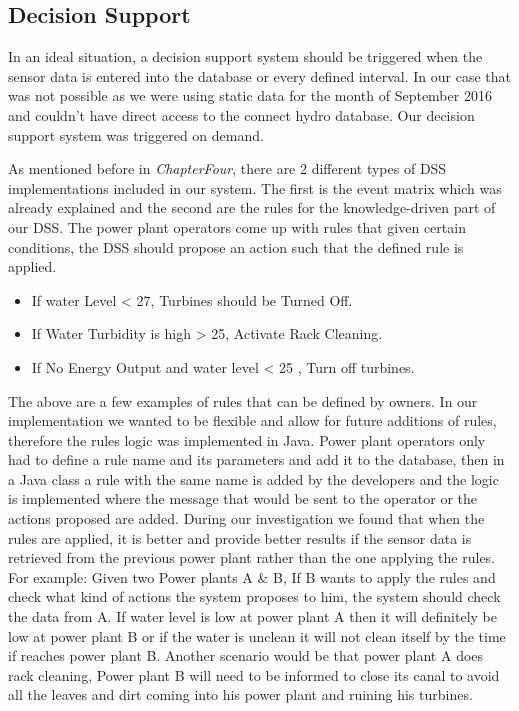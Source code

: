 \subsection{Decision Support}
\label{subsec:DecisionSuport}
In an ideal situation, a decision support system should be triggered when the sensor data is entered into the database or every defined interval. In our case that was not possible as we were using static data for the month of September 2016 and couldn't have direct access to the connect hydro database. Our decision support system was triggered on demand. 

As mentioned before in \textit{ChapterFour}, there are 2 different types of DSS implementations included in our system. The first is the event matrix which was already explained and the second are the rules for the knowledge-driven part of our DSS. The power plant operators come up with rules that given certain conditions, the DSS should propose an action such that the defined rule is applied.
\begin{itemize}
	\item If water Level < 27, Turbines should be Turned Off.
	\item If Water Turbidity is high > 25, Activate Rack Cleaning.
	\item If No Energy Output and water level < 25 , Turn off turbines.
\end{itemize}
The above are a few examples of rules that can be defined by owners. In our implementation we wanted to be flexible and allow for future additions of rules, therefore the rules logic was implemented in Java. Power plant operators only had to define a rule name and its parameters and add it to the database, then in a Java class a rule with the same name is added by the developers and the logic is implemented where the message that would be sent to the operator or the actions proposed are added. During our investigation we found that when the rules are applied, it is better and provide better results if the sensor data is retrieved from the previous power plant rather than the one applying the rules. For example: Given two Power plants A \& B, If B wants to apply the rules and check what kind of actions the system proposes to him, the system should check the data from A. If water level is low at power plant A then it will definitely be low at power plant B or if the water is unclean it will not clean itself by the time if reaches power plant B. Another scenario would be that power plant A does rack cleaning, Power plant B will need to be informed to close its canal to avoid all the leaves and dirt coming into his power plant and ruining his turbines.

